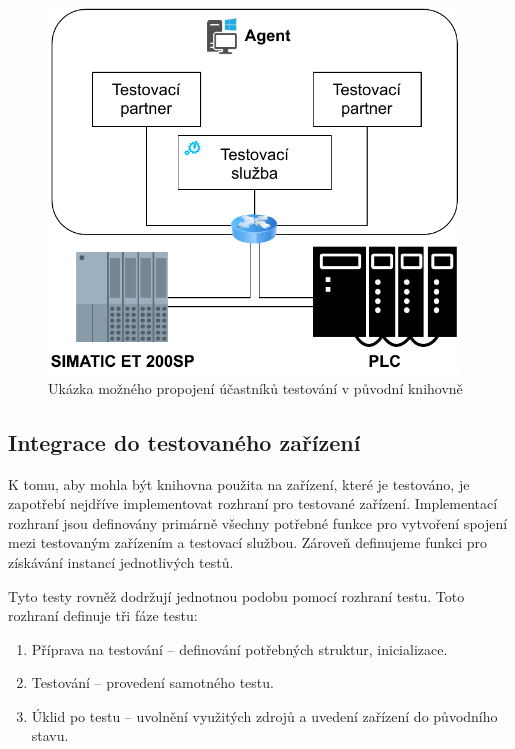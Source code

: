 \begin{figure}[htbp]
    \centering 
    \includegraphics[width=0.97\textwidth]{assets/img/bp_assets/devicemodel.pdf}
    \caption{Ukázka možného propojení účastníků testování v původní knihovně}
    \label{fig:bp_devicemodel}
\end{figure}


\subsection{Integrace do testovaného zařízení}

K tomu, aby mohla být knihovna použita na zařízení, které je testováno, je zapotřebí nejdříve implementovat rozhraní pro testované zařízení. Implementací rozhraní jsou definovány primárně všechny potřebné funkce pro vytvoření spojení mezi testovaným zařízením a testovací službou. Zároveň definujeme funkci pro získávání instancí jednotlivých testů. 

Tyto testy rovněž dodržují jednotnou podobu pomocí rozhraní testu. Toto rozhraní definuje tři fáze testu:

\begin{enumerate}
    \item Příprava na testování -- definování potřebných struktur, inicializace.
    \item Testování -- provedení samotného testu.
    \item Úklid po testu -- uvolnění využitých zdrojů a uvedení zařízení do původního stavu.
\end{enumerate}

